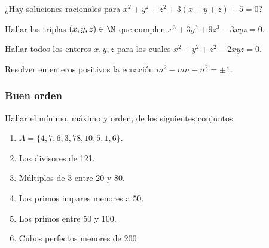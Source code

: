 \begin{problem}
    ¿Hay soluciones racionales para $x^2+ y^2 + z^2 + 3(x+y+z) + 5 = 0$?
\end{problem}

\begin{problem}
    Hallar las triplas $(x,y,z) \in \N$ que cumplen $x^3 + 3y^3 + 9z^3 - 3xyz = 0$.
\end{problem}

\begin{problem}
    Hallar todos los enteros $x,y,z$ para los cuales $x^2 + y^2 + z^2 - 2xyz = 0$.
\end{problem}

\begin{problem}
    Resolver en enteros positivos la ecuación $m^2 - mn - n^2 = \pm 1.$
\end{problem}



\subsubsection{Buen orden}
\begin{exercise}
    Hallar el mínimo, máximo y orden, de los siguientes conjuntos.
    \begin{multicols}{2}
        \begin{enumerate}
            \item $A = \{4,7,6,3,78,10,5, 1,6\}$.
            \item Los divisores de 121.
            \item Múltiplos de 3 entre 20 y 80.
            \item Los primos impares menores a 50.
            \item Los primos entre 50 y 100.
            \item Cubos perfectos menores de 200
        \end{enumerate}
    \end{multicols}
\end{exercise}